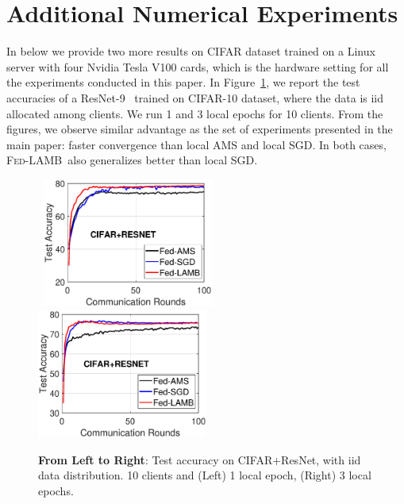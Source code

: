 \documentclass[11pt]{article}
\newcommand{\algo}{\textsc{Fed-LAMB}}
\begin{document}
\section{Additional Numerical Experiments}\label{app:numericals}

In below we provide two more results on CIFAR dataset trained on a Linux server with four Nvidia Tesla V100 cards, which is the hardware setting for all the experiments conducted in this paper. In Figure~\ref{fig:cifar-cnn-iid-bis}, we report the test accuracies of a ResNet-9~\cite{Proc:He-resnet16} trained on CIFAR-10 dataset, where the data is iid allocated among clients. 
We run 1 and 3 local epochs for 10 clients. From the figures, we observe similar advantage as the set of experiments presented in the main paper: faster convergence than local AMS and local SGD. In both cases, \algo\ also generalizes better than local SGD.


\begin{figure}[H]
    \begin{center}
        \mbox{
        \includegraphics[width=0.5\textwidth]{figure/cifar_testerror_resnet_ep1_client10_iid1_SGD.eps}
                \includegraphics[width=0.5\textwidth]{figure/cifar_testerror_resnet_ep3_client10_iid1_SGD.eps}
        }
    \end{center}
	\caption{\textbf{From Left to Right}: Test accuracy on CIFAR+ResNet, with iid data distribution. 10 clients and (Left) 1 local epoch, (Right) 3 local epochs.}
	\label{fig:cifar-cnn-iid-bis}
\end{figure}


\clearpage



\end{document}
